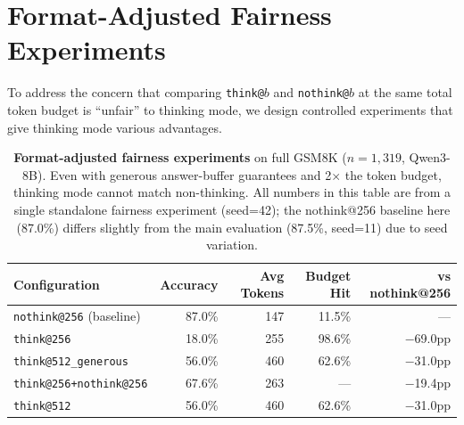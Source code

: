 \section{Format-Adjusted Fairness Experiments}
\label{app:fairness}

To address the concern that comparing \texttt{think@$b$} and \texttt{nothink@$b$} at the same total token budget is ``unfair'' to thinking mode, we design controlled experiments that give thinking mode various advantages.

\begin{table}[ht]
\centering
\caption{\textbf{Format-adjusted fairness experiments} on full GSM8K ($n{=}1{,}319$, Qwen3-8B).
Even with generous answer-buffer guarantees and 2$\times$ the token budget, thinking mode cannot match non-thinking.
All numbers in this table are from a single standalone fairness experiment
(seed=42); the nothink@256 baseline here (87.0\%) differs slightly from
the main evaluation (87.5\%, seed=11) due to seed variation.}
\label{tab:fairness}
\small
\begin{tabular}{lrrrr}
\toprule
\textbf{Configuration} & \textbf{Accuracy} & \textbf{Avg Tokens} & \textbf{Budget Hit} & \textbf{vs nothink@256} \\
\midrule
\texttt{nothink@256} (baseline) & 87.0\% & 147 & 11.5\% & --- \\
\texttt{think@256} & 18.0\% & 255 & 98.6\% & $-$69.0pp \\
\texttt{think@512\_generous} & 56.0\% & 460 & 62.6\% & $-$31.0pp \\
\texttt{think@256+nothink@256} & 67.6\% & 263 & --- & $-$19.4pp \\
\texttt{think@512} & 56.0\% & 460 & 62.6\% & $-$31.0pp \\
\bottomrule
\end{tabular}
\end{table}

